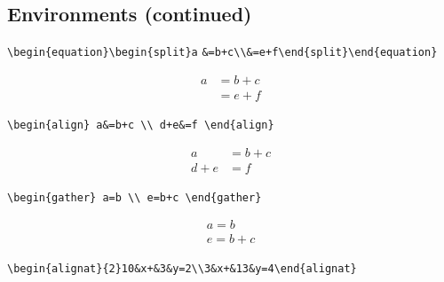 \documentclass[9pt]{extarticle}
\begin{document}

\newpage
\subsection*{Environments (continued)}

{\small\verb|\begin{equation}\begin{split}a| \verb|&=b+c\\&=e+f\end{split}\end{equation}|}

\begin{equation}\begin{split}a &=b+c\\&=e+f\end{split}\end{equation}

{\small\verb|\begin{align} a&=b+c \\ d+e&=f \end{align}|}

\begin{align} a&=b+c \\ d+e&=f \end{align}

{\small\verb|\begin{gather} a=b \\ e=b+c \end{gather}|}

\begin{gather} a=b \\ e=b+c \end{gather}

{\small\verb|\begin{alignat}{2}10&x+&3&y=2\\3&x+&13&y=4\end{alignat}|}
\end{document}
